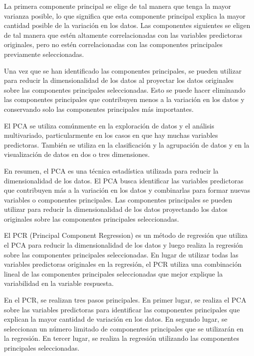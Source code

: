 \documentclass[
  letterpaper,
  DIV=11,
  numbers=noendperiod]{scrartcl}
\begin{document}
La primera componente principal se elige de tal manera que tenga la
mayor varianza posible, lo que significa que esta componente principal
explica la mayor cantidad posible de la variación en los datos. Las
componentes siguientes se eligen de tal manera que estén altamente
correlacionadas con las variables predictoras originales, pero no estén
correlacionadas con las componentes principales previamente
seleccionadas.

Una vez que se han identificado las componentes principales, se pueden
utilizar para reducir la dimensionalidad de los datos al proyectar los
datos originales sobre las componentes principales seleccionadas. Esto
se puede hacer eliminando las componentes principales que contribuyen
menos a la variación en los datos y conservando solo las componentes
principales más importantes.

El PCA se utiliza comúnmente en la exploración de datos y el análisis
multivariado, particularmente en los casos en que hay muchas variables
predictoras. También se utiliza en la clasificación y la agrupación de
datos y en la visualización de datos en dos o tres dimensiones.

En resumen, el PCA es una técnica estadística utilizada para reducir la
dimensionalidad de los datos. El PCA busca identificar las variables
predictoras que contribuyen más a la variación en los datos y
combinarlas para formar nuevas variables o componentes principales. Las
componentes principales se pueden utilizar para reducir la
dimensionalidad de los datos proyectando los datos originales sobre las
componentes principales seleccionadas.

El PCR (Principal Component Regression) es un método de regresión que
utiliza el PCA para reducir la dimensionalidad de los datos y luego
realiza la regresión sobre las componentes principales seleccionadas. En
lugar de utilizar todas las variables predictoras originales en la
regresión, el PCR utiliza una combinación lineal de las componentes
principales seleccionadas que mejor explique la variabilidad en la
variable respuesta.

En el PCR, se realizan tres pasos principales. En primer lugar, se
realiza el PCA sobre las variables predictoras para identificar las
componentes principales que explican la mayor cantidad de variación en
los datos. En segundo lugar, se seleccionan un número limitado de
componentes principales que se utilizarán en la regresión. En tercer
lugar, se realiza la regresión utilizando las componentes principales
seleccionadas.
\end{document}
